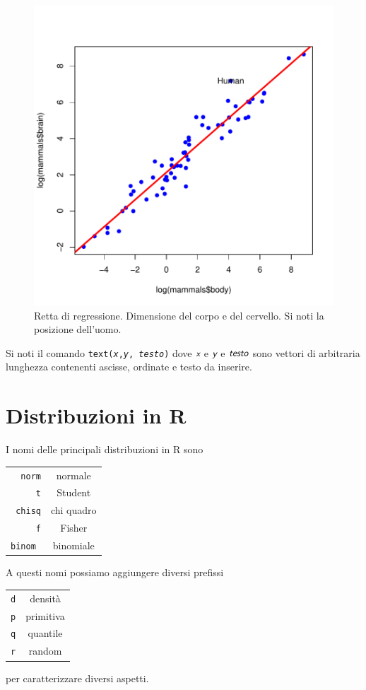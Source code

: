 \documentclass[onecolumn,11pt]{book}
\newcommand{\varia}[1]{\textsl{\textsf{#1}}}
\begin{document}
\begin{figure}[htbp]
\begin{center}
\includegraphics{statisticaconR-180}
\caption{ Retta di regressione. Dimensione del corpo e del cervello. Si noti la posizione dell'uomo.}
\label{duerette}
\end{center}
\end{figure}
Si noti il comando \texttt{text(\varia{x},\varia{y}, \varia{testo})}
dove    $\varia{x}$ e $\varia{y}$  e $\varia{testo}$ sono vettori di arbitraria lunghezza contenenti ascisse, ordinate e testo da inserire.
\section{Distribuzioni in \textsf{R}}
I nomi delle principali distribuzioni in \textsf{R} sono\vskip10pt
\begin{tabular}{|r|c |}
\hline
\texttt{norm}&normale\\
\texttt{t}  &Student\\
\texttt{chisq}& chi quadro\\
\texttt{f}&Fisher\\
\texttt{binom }&binomiale\\
\hline
\end{tabular}\vskip10pt
A questi nomi possiamo aggiungere diversi prefissi\vskip10pt
\begin{tabular}{|r|c |}
\hline
\texttt{d}&densit\`a\\
\texttt{p}  &primitiva\\
\texttt{q}& quantile\\
\texttt{r}&random\\
  \hline
\end{tabular}
\vskip10pt
per caratterizzare diversi aspetti.
\end{document}
